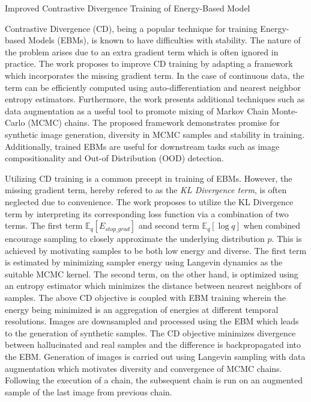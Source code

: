\documentclass[11pt,letterpaper]{article}
\begin{document}
\begin{center}
  \large{Improved Contrastive Divergence Training of Energy-Based Model}
\end{center}

Contrastive Divergence (CD), being a popular technique for training Energy-based Models (EBMs), is known to have difficulties with stability. The nature of the problem arises due to an extra gradient term which is often ignored in practice. The work proposes to improve CD training by adapting a framework which incorporates the missing gradient term. In the case of continuous data, the term can be efficiently computed using auto-differentiation and nearest neighbor entropy estimators. Furthermore, the work presents additional techniques such as data augmentation as a useful tool to promote mixing of Markov Chain Monte-Carlo (MCMC) chains. The proposed framework demonstrates promise for synthetic image generation, diversity in MCMC samples and stability in training. Additionally, trained EBMs are useful for downstream tasks such as image compositionality and Out-of Distribution (OOD) detection.

Utilizing CD training is a common precept in training of EBMs. However, the missing gradient term, hereby refered to as the \textit{KL Divergence term}, is often neglected due to convenience. The work proposes to utilize the KL Divergence term by interpreting its corresponding loss function via a combination of two terms. The first term $\mathbb{E}_{q}[E_{stop\_grad}]$ and second term $\mathbb{E}_{q}[\log q]$ when combined encourage sampling to closely approximate the underlying distribution $p$. This is achieved by motivating samples to be both low energy and diverse. The first term is estimated by minimizing sampler energy using Langevin dynamics as the suitable MCMC kernel. The second term, on the other hand, is optimized using an entropy estimator which minimizes the distance between nearest neighbors of samples. The above CD objective is coupled with EBM training wherein the energy being minimized is an aggregation of energies at different temporal resolutions. Images are downsampled and processed using the EBM which leads to the generation of synthetic samples. The CD objective minimizes divergence between hallucinated and real samples and the difference is backpropagated into the EBM. Generation of images is carried out using Langevin sampling with data augmentation which motivates diversity and convergence of MCMC chains. Following the execution of a chain, the subsequent chain is run on an augmented sample of the last image from previous chain.
\end{document}
